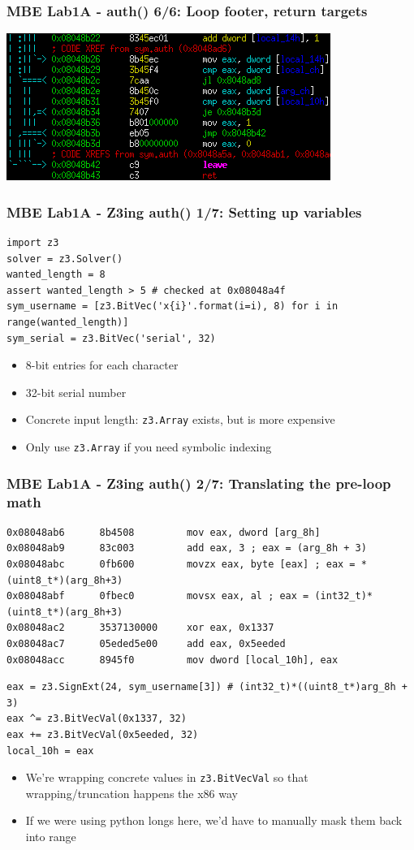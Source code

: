 \documentclass[aspectratio=169]{beamer}
\begin{document}
\begin{frame}[fragile]
\frametitle{MBE Lab1A - auth() 6/6: Loop footer, return targets}
\includegraphics[width=0.9\paperwidth]{pictures/intel/mbe_lab1a_auth_chunk6.png}
\end{frame}

\begin{frame}[fragile]
\frametitle{MBE Lab1A - Z3ing auth() 1/7: Setting up variables}
\begin{Verbatim}[fontsize=\scriptsize, frame=single]
import z3
solver = z3.Solver()
wanted_length = 8
assert wanted_length > 5 # checked at 0x08048a4f
sym_username = [z3.BitVec('x{i}'.format(i=i), 8) for i in range(wanted_length)]
sym_serial = z3.BitVec('serial', 32)
\end{Verbatim}
\begin{itemize}
\item 8-bit entries for each character
\item 32-bit serial number
\item Concrete input length: \verb|z3.Array| exists, but is more expensive
\item Only use \verb|z3.Array| if you need symbolic indexing
\end{itemize}
\end{frame}

\begin{frame}[fragile]
\frametitle{MBE Lab1A - Z3ing auth() 2/7: Translating the pre-loop math}
\begin{Verbatim}[fontsize=\scriptsize, frame=single]
0x08048ab6      8b4508         mov eax, dword [arg_8h]
0x08048ab9      83c003         add eax, 3 ; eax = (arg_8h + 3)
0x08048abc      0fb600         movzx eax, byte [eax] ; eax = *(uint8_t*)(arg_8h+3)
0x08048abf      0fbec0         movsx eax, al ; eax = (int32_t)*(uint8_t*)(arg_8h+3)
0x08048ac2      3537130000     xor eax, 0x1337
0x08048ac7      05eded5e00     add eax, 0x5eeded
0x08048acc      8945f0         mov dword [local_10h], eax
\end{Verbatim}

\begin{Verbatim}[fontsize=\scriptsize, frame=single]
eax = z3.SignExt(24, sym_username[3]) # (int32_t)*((uint8_t*)arg_8h + 3)
eax ^= z3.BitVecVal(0x1337, 32)
eax += z3.BitVecVal(0x5eeded, 32)
local_10h = eax
\end{Verbatim}
\begin{itemize}
\item We're wrapping concrete values in \verb|z3.BitVecVal| so that wrapping/truncation happens the x86 way
\item If we were using python longs here, we'd have to manually mask them back into range
\end{itemize}
\end{frame}
\end{document}
